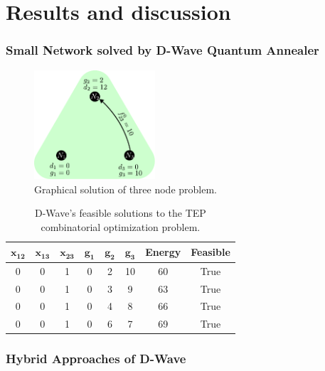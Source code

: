 
\chapter{Results and discussion} %

\label{Chapter5} %
\subsection{Small Network solved by D-Wave Quantum Annealer}
\begin{figure}[H]
  \begin{center}
\includegraphics[width=0.4\textwidth]{Figures/Green_Final.pdf}
  \end{center}
  \caption{Graphical solution of three node problem.}
  \label{fig: Green_final}
\end{figure}
 \begin{table}[H]
\centering
\begin{tabular}{ |c|c|c|c|c|c|c|c| }
  \hline			
  $\mathbf{x_{12}}$ & $\mathbf{x_{13}}$ & $\mathbf{x_{23}}$ & $\mathbf{g_{1}}$ & $\mathbf{g_{2}}$ & $\mathbf{g_{3}}$ & \textbf{Energy} & \textbf{Feasible} \\
  \hline
    0 & 0 & 1 & 0 & 2 & 10 & 60 & True \\
  \hline
    0 & 0 & 1 & 0 & 3 & 9 & 63 & True \\
  \hline
    0 & 0 & 1 & 0 & 4 & 8 & 66 & True \\
  \hline
    0 & 0 & 1 & 0 & 6 & 7 & 69 & True \\
  \hline
\end{tabular}
\caption{D-Wave's feasible solutions to the TEP combinatorial optimization problem.}
\label{tab:SmallNetworkResults}
\end{table}
\subsection{Hybrid Approaches of D-Wave}

